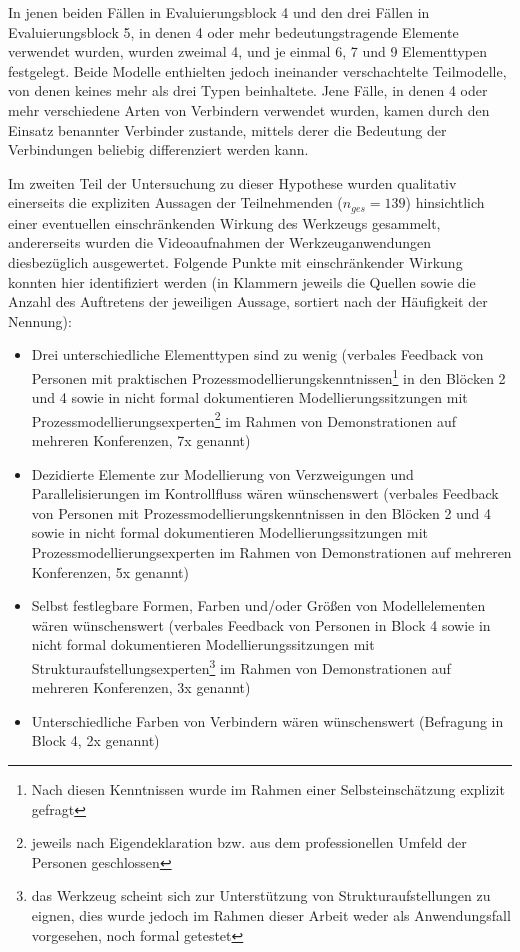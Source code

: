 In jenen beiden Fällen in Evaluierungsblock 4 und den drei Fällen in Evaluierungsblock 5, in denen 4 oder mehr bedeutungstragende Elemente verwendet wurden, wurden zweimal 4, und je einmal 6, 7 und 9 Elementtypen festgelegt. Beide Modelle enthielten jedoch ineinander verschachtelte Teilmodelle, von denen keines mehr als drei Typen beinhaltete. Jene Fälle, in denen 4 oder mehr verschiedene Arten von Verbindern verwendet wurden, kamen durch den Einsatz benannter Verbinder zustande, mittels derer die Bedeutung der Verbindungen beliebig differenziert werden kann.

Im zweiten Teil der Untersuchung zu dieser Hypothese wurden qualitativ einerseits die expliziten Aussagen der Teilnehmenden ($n_{ges}=139$) hinsichtlich einer eventuellen einschränkenden Wirkung des Werkzeugs gesammelt, andererseits wurden die Videoaufnahmen der Werkzeuganwendungen diesbezüglich ausgewertet. Folgende Punkte mit einschränkender Wirkung konnten hier identifiziert werden (in Klammern jeweils die Quellen sowie die Anzahl des Auftretens der jeweiligen Aussage, sortiert nach der Häufigkeit der Nennung):
\begin{itemize}
	\item Drei unterschiedliche Elementtypen sind zu wenig (verbales Feedback von Personen mit praktischen Prozessmodellierungskenntnissen\footnote{Nach diesen Kenntnissen wurde im Rahmen einer Selbsteinschätzung explizit gefragt} in den Blöcken 2 und 4 sowie in nicht formal dokumentieren Modellierungssitzungen mit Prozessmodellierungsexperten\footnote{jeweils nach Eigendeklaration bzw. aus dem professionellen Umfeld der Personen geschlossen} im Rahmen von Demonstrationen auf mehreren Konferenzen, 7x genannt)
	\item Dezidierte Elemente zur Modellierung von Verzweigungen und Parallelisierungen im Kontrollfluss wären wünschenswert (verbales Feedback von Personen mit Prozessmodellierungskenntnissen in den Blöcken 2 und 4 sowie in nicht formal dokumentieren Modellierungssitzungen mit Prozessmodellierungsexperten im Rahmen von Demonstrationen auf mehreren Konferenzen, 5x genannt)
	\item Selbst festlegbare Formen, Farben und/oder Größen von Modellelementen wären wünschenswert (verbales Feedback von Personen in Block 4 sowie in nicht formal dokumentieren Modellierungssitzungen mit  Strukturaufstellungsexperten\footnote{das Werkzeug scheint sich zur Unterstützung von Strukturaufstellungen \citep{Sparrer02} zu eignen, dies wurde jedoch im Rahmen dieser Arbeit weder als Anwendungsfall vorgesehen, noch formal getestet} im Rahmen von Demonstrationen auf mehreren Konferenzen, 3x genannt)
	\item Unterschiedliche Farben von Verbindern wären wünschenswert (Befragung in Block 4, 2x genannt)
\end{itemize}

